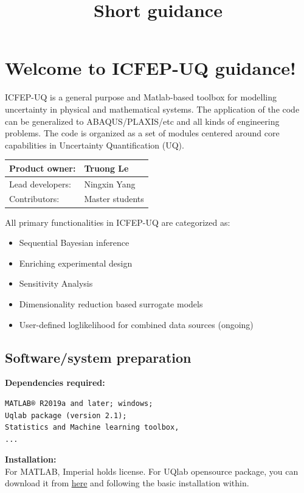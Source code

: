 \documentclass{ol-softwaremanual}
\title{Short guidance}
\begin{document}
\maketitle

\tableofcontents
\listoflistings
\newpage
\section{Welcome to ICFEP-UQ guidance!}\label{ICFEP-UQ_setup}
ICFEP-UQ is a general purpose and Matlab-based toolbox for modelling uncertainty in physical and mathematical systems. The application of the code can be generalized to ABAQUS/PLAXIS/etc and all kinds of engineering problems. The code is organized as a set of modules centered around core capabilities in Uncertainty Quantification (UQ).
\begin{table}[htbp]
\begin{tabular}{|l|l|}
\hline
\textbf{Product owner:} & Truong Le       \\ \hline
Lead developers:        & Ningxin Yang    \\ \hline
Contributors:           & Master students \\ \hline
\end{tabular}
\end{table}

All primary functionalities in ICFEP-UQ are categorized as:
\begin{itemize}
    \item Sequential Bayesian inference
    \item Enriching experimental design
    \item Sensitivity Analysis 
    \item Dimensionality reduction based surrogate models 
    \item User-defined loglikelihood for combined data sources (ongoing)
\end{itemize}

\subsection*{Software/system preparation}
\textbf{Dependencies required:}
\begin{verbatim}
MATLAB® R2019a and later; windows; 
Uqlab package (version 2.1); 
Statistics and Machine learning toolbox,
...
\end{verbatim}

\textbf{Installation:}\\
For MATLAB, Imperial holds license. For UQlab opensource package, you can download it from \href{https://www.uqlab.com/install}{here} and following the basic installation within.
\end{document}
